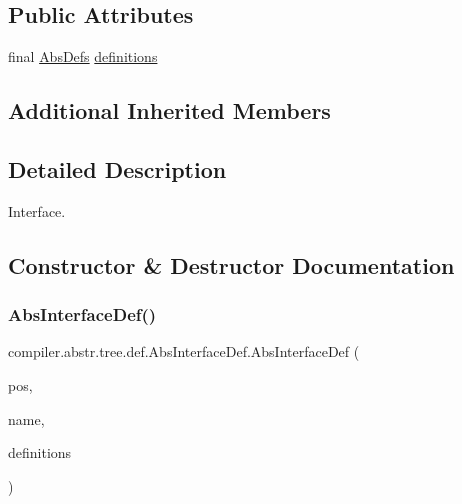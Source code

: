 \subsection*{Public Attributes}
\begin{DoxyCompactItemize}
\item 
final \hyperlink{classcompiler_1_1abstr_1_1tree_1_1_abs_defs}{Abs\+Defs} \hyperlink{classcompiler_1_1abstr_1_1tree_1_1def_1_1_abs_interface_def_a264407486d391f932293c3e96dfc9372}{definitions}
\end{DoxyCompactItemize}
\subsection*{Additional Inherited Members}


\subsection{Detailed Description}
Interface. 

\subsection{Constructor \& Destructor Documentation}
\mbox{\label{classcompiler_1_1abstr_1_1tree_1_1def_1_1_abs_interface_def_a9c696bb3ae71ca6aa776a29bf789c382}} 
\subsubsection{\texorpdfstring{Abs\+Interface\+Def()}{AbsInterfaceDef()}}
{\footnotesize\ttfamily compiler.\+abstr.\+tree.\+def.\+Abs\+Interface\+Def.\+Abs\+Interface\+Def (\begin{DoxyParamCaption}\item[{\hyperlink{classcompiler_1_1_position}{Position}}]{pos,  }\item[{String}]{name,  }\item[{\hyperlink{classcompiler_1_1abstr_1_1tree_1_1_abs_defs}{Abs\+Defs}}]{definitions }\end{DoxyParamCaption})}


